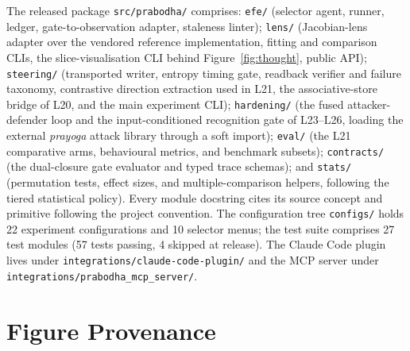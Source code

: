 The released package \texttt{src/prabodha/} comprises: \texttt{efe/} (selector agent, runner, ledger, gate-to-observation adapter, staleness linter); \texttt{lens/} (Jacobian-lens adapter over the vendored reference implementation, fitting and comparison CLIs, the slice-visualisation CLI behind Figure~\ref{fig:thought}, public API); \texttt{steering/} (transported writer, entropy timing gate, readback verifier and failure taxonomy, contrastive direction extraction used in L21, the associative-store bridge of L20, and the main experiment CLI); \texttt{hardening/} (the fused attacker-defender loop and the input-conditioned recognition gate of L23--L26, loading the external \emph{prayoga} attack library through a soft import); \texttt{eval/} (the L21 comparative arms, behavioural metrics, and benchmark subsets); \texttt{contracts/} (the dual-closure gate evaluator and typed trace schemas); and \texttt{stats/} (permutation tests, effect sizes, and multiple-comparison helpers, following the tiered statistical policy). Every module docstring cites its source concept and primitive following the project convention. The configuration tree \texttt{configs/} holds 22 experiment configurations and 10 selector menus; the test suite comprises 27 test modules (57 tests passing, 4 skipped at release). The Claude Code plugin lives under \texttt{integrations/claude-code-plugin/} and the MCP server under \texttt{integrations/prabodha\_mcp\_server/}.

\section{Figure Provenance}
\label{app:figures}

